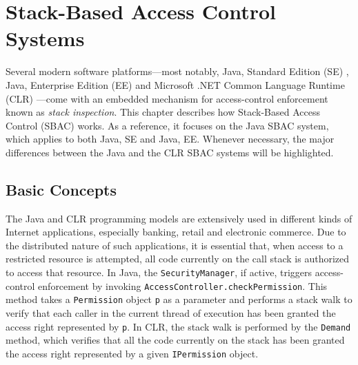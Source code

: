 \chapter{Stack-Based Access Control Systems} \label{chap:SBACSystems}

Several modern software platforms---most notably, Java, Standard Edition (SE)
\cite{book:J2SESecBook,book:LiGong}, Java, Enterprise Edition (EE) \cite{book:J2EESecBook} and
Microsoft .NET Common Language Runtime (CLR) \cite{book:DotNetSecurity}---come with an embedded
mechanism for access-control enforcement known as \emph{stack inspection}. 
This chapter describes how Stack-Based Access Control (SBAC)
works.  As a reference, it focuses on the Java SBAC system, which applies
to both Java, SE and Java, EE.  Whenever
necessary, the major differences between the Java and the CLR
SBAC systems will be highlighted.

\section{Basic Concepts}

The Java
and CLR programming models are
extensively used in different kinds of Internet applications,
especially banking, retail and electronic commerce. Due to the
distributed nature of such applications, it is essential that,
when access to a restricted resource is attempted, all code
currently on the call stack is authorized to access that resource.
In Java, the
\texttt{SecurityManager}, if active, triggers access-control
enforcement by invoking \texttt{AccessController.checkPermission}.
This method takes a \texttt{Permission} object \texttt{p} as a
parameter and performs a stack walk to verify that each caller in
the current thread of execution has been granted the access right
represented by \texttt{p}. In CLR, the stack walk is performed by
the \texttt{Demand} method, which verifies that all the code
currently on the stack has been granted the access right
represented by a given \texttt{IPermission} object.

